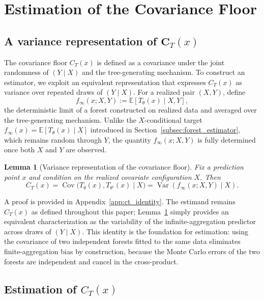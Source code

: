 \documentclass[11pt]{article}
\theoremstyle{plain}
\newtheorem{lemma}{Lemma}
\theoremstyle{definition}
\theoremstyle{remark}
\DeclareMathOperator{\Var}{Var}
\DeclareMathOperator{\Cov}{Cov}
\begin{document}
\section{Estimation of the Covariance Floor}
\label{sec:ct_estimation}

\subsection{A variance representation of $\boldsymbol{C}_T(x)$}
\label{subsec:ct_identity}

The covariance floor $C_T(x)$ is defined as a covariance under the joint randomness of $(Y \mid X)$ and the tree-generating mechanism. To construct an estimator, we exploit an equivalent representation that expresses $C_T(x)$ as variance over repeated draws of $(Y \mid X)$. For a realized pair $(X,Y)$, define
\[
f_\infty(x;X,Y)
:=
\mathbb E\!\left[T_\theta(x)\mid X,Y\right],
\]
the deterministic limit of a forest constructed on realized data and averaged over the tree-generating mechanism. Unlike the $X$-conditional target $f_\infty(x)=\mathbb E[T_\theta(x)\mid X]$ introduced in Section~\ref{subsec:forest_estimator}, which remains random through $Y$, the quantity $f_\infty(x;X,Y)$ is fully determined once both $X$ and $Y$ are observed.

\begin{lemma}[Variance representation of the covariance floor]
	\label{lem:ct_identity}
	Fix a prediction point $x$ and condition on the realized covariate configuration $X$. Then
	\[
	C_T(x)
	=
	\Cov\!\bigl(T_\theta(x),T_{\theta'}(x)\mid X\bigr)
	=
	\Var\!\left(f_\infty(x;X,Y)\mid X\right).
	\]
\end{lemma}

A proof is provided in Appendix~\ref{app:ct_identity}. The estimand remains $C_T(x)$ as defined throughout this paper; Lemma~\ref{lem:ct_identity} simply provides an equivalent characterization as the variability of the infinite-aggregation predictor across draws of $(Y \mid X)$. This identity is the foundation for estimation: using the covariance of two independent forests fitted to the same data eliminates finite-aggregation bias by construction, because the Monte Carlo errors of the two forests are independent and cancel in the cross-product.

\subsection{Estimation of $C_T(x)$}
\label{subsec:ct_algorithm}
\end{document}
